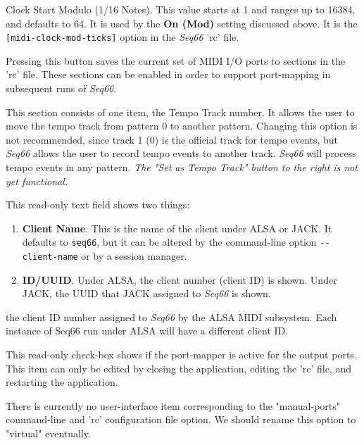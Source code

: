    Clock Start Modulo (1/16 Notes).
   This value starts at 1 and ranges up to 16384, and defaults to 64.
   It is used by the \textbf{On (Mod)} setting discussed above.
   It is the \texttt{[midi-clock-mod-ticks]} option in the \textsl{Seq66}
   'rc' file.

   Pressing this button saves the current set of MIDI I/O ports to sections in
   the 'rc' file.  These sections can be enabled in order to support
   port-mapping in subsequent runs of \textsl{Seq66}.

   This section consists of one item, the Tempo Track number.
   It allows the user to move the tempo track from pattern 0 to
   another pattern.  Changing this option is not recommended, since track 1 (0)
   is the official track for tempo events, but \textsl{Seq66} allows the
   user to record tempo events to another track.  \textsl{Seq66} will
   process tempo events in any pattern.
   \textsl{The "Set as Tempo Track" button to the right is not yet functional.}

   This read-only text field shows two things:

   \begin{enumerate}
      \item \textbf{Client Name}.
         This is the name of the client under ALSA or JACK.  It defaults to
         \texttt{seq66}, but it can be altered by the command-line option
         \texttt{-{}-client-name} or by a session manager.
      \item \textbf{ID/UUID}.
         Under ALSA, the client number (client ID) is shown.
         Under JACK, the UUID that JACK assigned to \textsl{Seq66} is shown.
   \end{enumerate}

   the client ID number assigned to
   \textsl{Seq66} by the ALSA MIDI subsystem.
   Each instance of Seq66 run under ALSA will have a different client ID.

   This read-only check-box shows if the port-mapper is active for the output
   ports.  This item can only be edited by closing the application, editing the
   'rc' file, and restarting the application.

   There is currently no user-interface item corresponding to the "manual-ports"
   command-line and 'rc' configuration file option.
   We should rename this option to "virtual" eventually.

